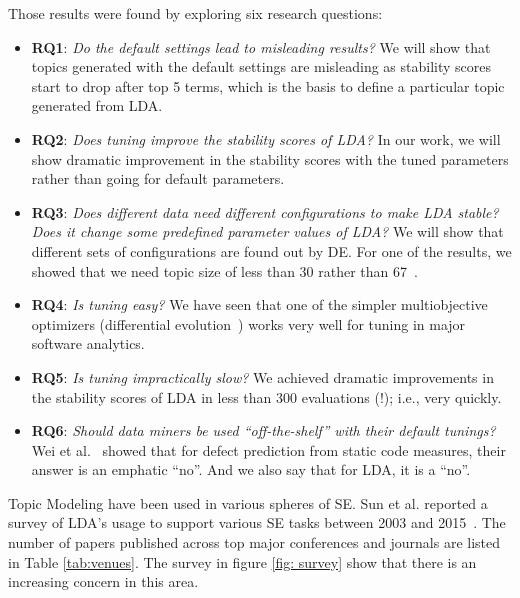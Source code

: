 \documentclass[conference]{IEEEtran}
\theoremstyle{break}
\begin{document}
Those results were found by exploring six research questions:
\begin{itemize}
    \item \textbf{RQ1}: \textit{Do the default settings lead to misleading results?} We will show that topics generated with the default settings are misleading as stability scores start to drop after top 5 terms, which is the basis to define a particular topic generated from LDA.
    \item \textbf{RQ2}: \textit{Does tuning improve the stability scores of LDA?} In our work, we will show dramatic improvement in the stability scores with the tuned parameters rather than going for default parameters.
    \item \textbf{RQ3}: \textit{Does different data need different configurations to make LDA stable? Does it change some predefined parameter values of LDA?} We will show that different sets of configurations are found out by DE. For one of the results, we showed that we need topic size of less than 30 rather than 67~\cite{garousi2016citations}.
    \item \textbf{RQ4}: \textit{Is tuning easy?} We have seen that one of the simpler multiobjective optimizers (differential evolution~\cite{storn1997differential}) works very well for tuning in major software analytics.
    \item \textbf{RQ5}: \textit{Is tuning impractically slow?} We achieved dramatic improvements in the stability scores of LDA in less than 300 evaluations (!); i.e., very quickly.
    \item \textbf{RQ6}: \textit{Should data miners be used “off-the-shelf” with their default tunings?} Wei et al.~\cite{fu2016tuning} showed that for defect prediction from static code measures, their answer is an emphatic “no”. And we also say that for LDA, it is a “no”. 
\end{itemize}

Topic Modeling have been used in various spheres of SE. Sun et al. reported a survey of LDA's usage to support various SE tasks between 2003 and 2015~\cite{sun2016exploring}. The number of papers published across top major conferences and journals are listed in Table \ref{tab:venues}. The survey in figure \ref{fig: survey} show that there is an increasing concern in this area.
\end{document}
